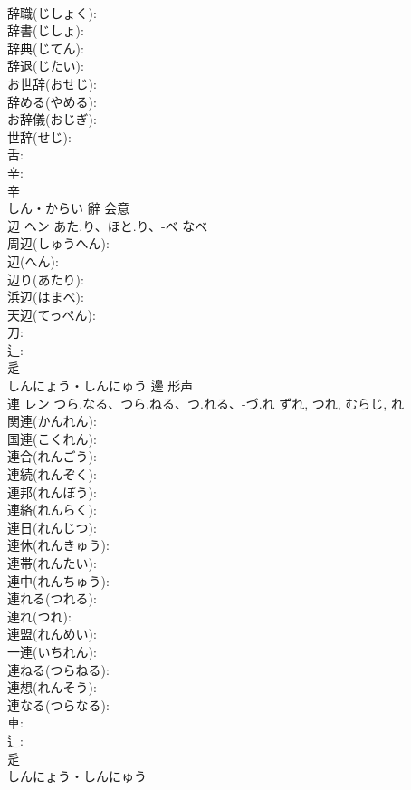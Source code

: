 \documentclass[8pt]{extreport}
\begin{document}
\begin{CJK}{UTF8}{min}
\\	辞職(じしょく): 
\\	辞書(じしょ): 
\\	辞典(じてん): 
\\	辞退(じたい): 
\\	お世辞(おせじ): 
\\	辞める(やめる): 
\\	お辞儀(おじぎ): 
\\	世辞(せじ): 
\\	舌: 
\\	辛: 
\\	辛	
\\	しん・からい	辭	会意 
\\	辺	ヘン	あた.り、ほと.り、-べ	なべ	
\\	周辺(しゅうへん): 
\\	辺(へん): 
\\	辺り(あたり): 
\\	浜辺(はまべ): 
\\	天辺(てっぺん): 
\\	刀: 
\\	辶: 
\\	辵	
\\	しんにょう・しんにゅう	邊	形声 
\\	連	レン	つら.なる、つら.ねる、つ.れる、-づ.れ	ずれ, つれ, むらじ, れ	
\\	関連(かんれん): 
\\	国連(こくれん): 
\\	連合(れんごう): 
\\	連続(れんぞく): 
\\	連邦(れんぽう): 
\\	連絡(れんらく): 
\\	連日(れんじつ): 
\\	連休(れんきゅう): 
\\	連帯(れんたい): 
\\	連中(れんちゅう): 
\\	連れる(つれる): 
\\	連れ(つれ): 
\\	連盟(れんめい): 
\\	一連(いちれん): 
\\	連ねる(つらねる): 
\\	連想(れんそう): 
\\	連なる(つらなる): 
\\	車: 
\\	辶: 
\\	辵	
\\	しんにょう・しんにゅう	

\end{CJK}
\end{document}
